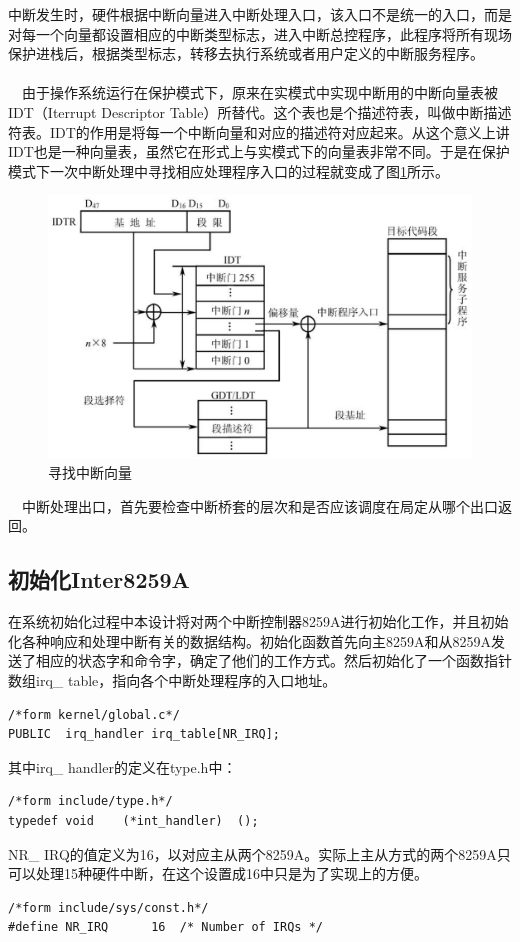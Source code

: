 \documentclass[UTF8,nofonts,cs4size]{ctexrep}
\begin{document}
\indent 中断发生时，硬件根据中断向量进入中断处理入口，该入口不是统一的入口，而是对每一个向量都设置相应的中断类型标志，进入中断总控程序，此程序将所有现场保护进栈后，根据类型标志，转移去执行系统或者用户定义的中断服务程序。
\paragraph{}
\indent \ \ 由于操作系统运行在保护模式下，原来在实模式中实现中断用的中断向量表被IDT（Iterrupt Descriptor Table）所替代。这个表也是个描述符表，叫做中断描述符表。IDT的作用是将每一个中断向量和对应的描述符对应起来。从这个意义上讲IDT也是一种向量表，虽然它在形式上与实模式下的向量表非常不同。于是在保护模式下一次中断处理中寻找相应处理程序入口的过程就变成了图\ref{interruptslove}所示。
\begin{figure}[htp]
\centering
\includegraphics[scale=0.4]{interruptslove.eps}
\caption{寻找中断向量}
\label{interruptslove}
\end{figure}
\indent \ \ 
中断处理出口，首先要检查中断桥套的层次和是否应该调度在局定从哪个出口返回。
\subsection{初始化Inter8259A}
在系统初始化过程中本设计将对两个中断控制器8259A进行初始化工作，并且初始化各种响应和处理中断有关的数据结构。初始化函数首先向主8259A和从8259A发送了相应的状态字和命令字，确定了他们的工作方式。然后初始化了一个函数指针数组irq\_ table，指向各个中断处理程序的入口地址。
\begin{lstlisting}
/*form kernel/global.c*/
PUBLIC	irq_handler	irq_table[NR_IRQ];
\end{lstlisting}
其中irq\_ handler的定义在type.h中：
\begin{lstlisting}
/*form include/type.h*/
typedef	void	(*int_handler)	();
\end{lstlisting}
NR\_ IRQ的值定义为16，以对应主从两个8259A。实际上主从方式的两个8259A只可以处理15种硬件中断，在这个设置成16中只是为了实现上的方便。
\begin{lstlisting}
/*form include/sys/const.h*/
#define	NR_IRQ		16	/* Number of IRQs */
\end{lstlisting}
\end{document}
